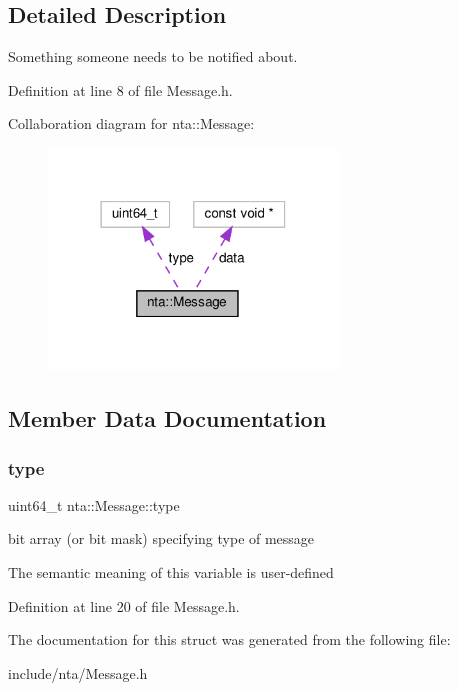 \subsection{Detailed Description}
Something someone needs to be notified about. 

Definition at line 8 of file Message.\+h.



Collaboration diagram for nta\+:\+:Message\+:\nopagebreak
\begin{figure}[H]
\begin{center}
\leavevmode
\includegraphics[width=218pt]{d3/dbb/structnta_1_1Message__coll__graph}
\end{center}
\end{figure}


\subsection{Member Data Documentation}
\mbox{\label{structnta_1_1Message_a512ef14eaa86f830247f8194cbbd4f83}} 
\subsubsection{\texorpdfstring{type}{type}}
{\footnotesize\ttfamily uint64\+\_\+t nta\+::\+Message\+::type}

bit array (or bit mask) specifying type of message

The semantic meaning of this variable is user-\/defined 

Definition at line 20 of file Message.\+h.



The documentation for this struct was generated from the following file\+:\begin{DoxyCompactItemize}
\item 
include/nta/Message.\+h\end{DoxyCompactItemize}

